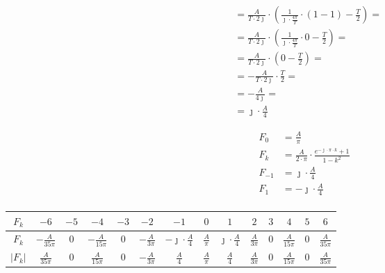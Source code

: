 \begin{task}
\begin{align*}
&=\frac{A}{T\cdot 2\jmath} \cdot \left( \frac{1}{\jmath \cdot \frac{4\pi}{T}} \cdot \left( 1 - 1\right) - \frac{T}{2}\right)=\\
&=\frac{A}{T\cdot 2\jmath} \cdot \left( \frac{1}{\jmath \cdot \frac{4\pi}{T}} \cdot 0 - \frac{T}{2}\right)=\\
&=\frac{A}{T\cdot 2\jmath} \cdot \left( 0 - \frac{T}{2}\right)=\\
&=-\frac{A}{T\cdot 2\jmath} \cdot \frac{T}{2} =\\
&=-\frac{A}{4 \jmath} =\\
&=\jmath \cdot \frac{A}{4} 
\end{align*}



\begin{align*}
F_0&=\frac{A}{\pi}\\
F_k&=\frac{A}{2 \cdot \pi} \cdot \frac{e^{-\jmath \cdot \pi \cdot k}+1}{1-k^2}\\
F_{-1}&=\jmath \cdot \frac{A}{4}\\
F_{1}&=-\jmath \cdot \frac{A}{4}\\
\end{align*}


\begin{table}[H]
  \centering  
  \begin{tabular}{|c|c|c|c|c|c|c|c|c|c|c|c|c|c|}
    \hline 
    $F_k$ & $-6$ & $-5$ & $-4$ & $-3$ & $-2$ & $-1$ & $0$& $1$& $2$& $3$& $4$& $5$ & $6$\\ 
    \hline 
    $F_k$ & $-\frac{A}{35\pi}$ & $0$ & $-\frac{A}{15\pi}$ & $0$ & $-\frac{A}{3\pi}$ & $-\jmath \cdot \frac{A}{4}$ & $\frac{A}{\pi}$ & $\jmath \cdot \frac{A}{4}$ & $\frac{A}{3\pi}$ & $0$ & $\frac{A}{15\pi}$ & $0$ & $\frac{A}{35\pi}$\\ 
    \hline 
    $\left|F_k\right|$ & $\frac{A}{35\pi}$ & $0$ & $\frac{A}{15\pi}$ & $0$ & $-\frac{A}{3\pi}$ & $\frac{A}{4}$ & $\frac{A}{\pi}$ & $\frac{A}{4}$ & $\frac{A}{3\pi}$ & $0$ & $\frac{A}{15\pi}$ & $0$ & $\frac{A}{35\pi}$\\ 
    \hline 
  \end{tabular} 
\end{table}


\end{task}
